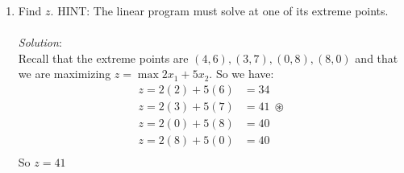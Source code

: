 \documentclass{article}
\begin{document}
\begin{enumerate}
\begin{enumerate}
    \item Find $z$. HINT: The linear program must solve at one of its extreme points. \\\\
    \textit{Solution}:\\
    Recall that the extreme points are 
    $(4, 6), (3, 7), (0, 8), (8, 0)$ and that we are maximizing $z = \max 2x_{1} + 5x_{2}$. So we have:
    \begin{align*}
    z =            2(2) +            5(6) &=            34  \;             \\
    z =            2(3) +            5(7) &=            41  \; \circledast \\
    z = 2(0)            + 5(8)            &= 40             \;             \\
    z = 2(8)            + 5(0)            &= 40             \;             \\
    \end{align*}
    So $z = 41$

    \end{enumerate}


\end{enumerate}
\end{document}
